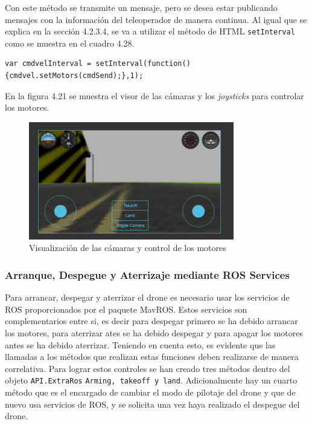 Con este método se transmite un mensaje, pero se desea estar publicando mensajes con la información del teleoperador de manera continua. Al igual que se explica en la sección 4.2.3.4, se va a utilizar el método de HTML \texttt{setInterval} como se muestra en el cuadro 4.28.

\begin{lstlisting}[caption= Publicación continua del mensaje con la información del teleoperador, label=cod.intervalMotors]
var cmdvelInterval = setInterval(function(){cmdvel.setMotors(cmdSend);},1);
\end{lstlisting}

En la figura 4.21 se muestra el visor de las cámaras y los \textit{joysticks} para controlar los motores.

\begin{figure}[H]
  \begin{center}
    \includegraphics[width=0.8\textwidth]{figures/camaradrone.png}
		\caption{Visualización de las cámaras y control de los motores}
		\label{fig.camaradrone}
		\end{center}
\end{figure}

\subsubsection{Arranque, Despegue y Aterrizaje mediante ROS Services}

Para arrancar, despegar y aterrizar el drone es necesario usar los servicios de ROS proporcionados por el paquete MavROS. Estos servicios son complementarios entre si, es decir para despegar primero se ha debido arrancar los motores, para aterrizar ates se ha debido despegar y para apagar los motores antes se ha debido aterrizar. Teniendo en cuenta esto, es evidente que las llamadas a los métodos que realizan estas funciones deben realizarse de manera correlativa. Para lograr estos controles se han creado tres métodos dentro del objeto \texttt{API.ExtraRos} \texttt{Arming, takeoff y land}. Adicionalmente hay un cuarto método que es el encargado de cambiar el modo de pilotaje del drone y que de nuevo usa servicios de ROS, y se solicita una vez haya realizado el despegue del drone.

